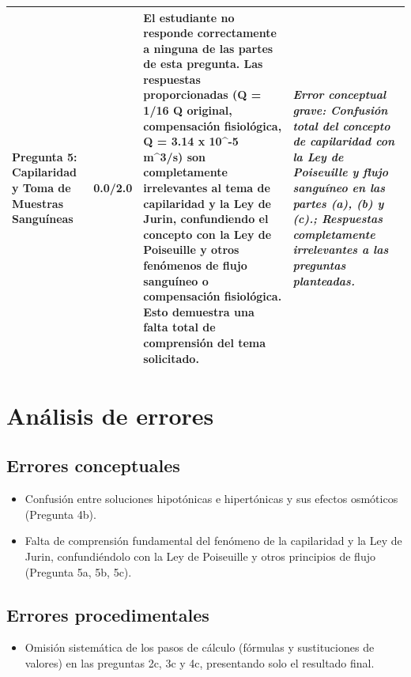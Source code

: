 \documentclass[11pt,a4paper]{article}
\begin{document}
\begin{longtable}{>{\bfseries}p{2.8cm} p{1.6cm} p{7.0cm} p{2.8cm}}
    \midrule
    \textbf{Pregunta 5: Capilaridad y Toma de Muestras Sanguíneas} & 0.0/2.0 & El estudiante no responde correctamente a ninguna de las partes de esta pregunta. Las respuestas proporcionadas (Q = 1/16 Q original, compensación fisiológica, Q = 3.14 x 10\textasciicircum{}-5 m\textasciicircum{}3/s) son completamente irrelevantes al tema de capilaridad y la Ley de Jurin, confundiendo el concepto con la Ley de Poiseuille y otros fenómenos de flujo sanguíneo o compensación fisiológica. Esto demuestra una falta total de comprensión del tema solicitado. & \textit{Error conceptual grave: Confusión total del concepto de capilaridad con la Ley de Poiseuille y flujo sanguíneo en las partes (a), (b) y (c).; Respuestas completamente irrelevantes a las preguntas planteadas.} \\
    \midrule
\end{longtable}

\section*{Análisis de errores}

\subsection*{Errores conceptuales}
\begin{itemize}[leftmargin=1.5em, itemsep=2pt]
  \item Confusión entre soluciones hipotónicas e hipertónicas y sus efectos osmóticos (Pregunta 4b).
  \item Falta de comprensión fundamental del fenómeno de la capilaridad y la Ley de Jurin, confundiéndolo con la Ley de Poiseuille y otros principios de flujo (Pregunta 5a, 5b, 5c).
\end{itemize}

\subsection*{Errores procedimentales}
\begin{itemize}[leftmargin=1.5em, itemsep=2pt]
  \item Omisión sistemática de los pasos de cálculo (fórmulas y sustituciones de valores) en las preguntas 2c, 3c y 4c, presentando solo el resultado final.
\end{itemize}

\end{document}
